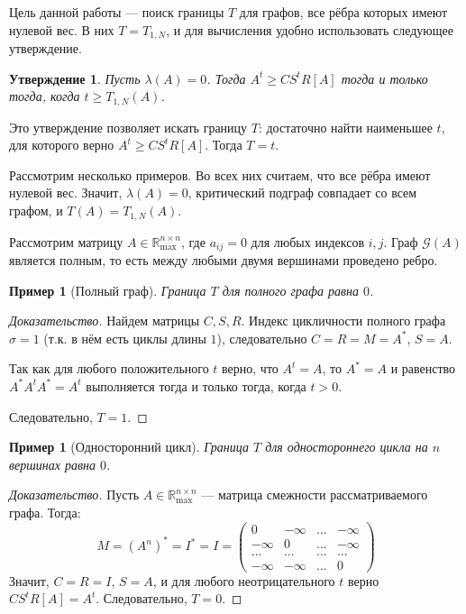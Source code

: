 \documentclass[12pt]{article}
\newtheorem{proposition}[theorem]{Утверждение}
\newtheorem{example}[theorem]{Пример}
\begin{document}
Цель данной работы --- поиск границы $T$ для графов, все рёбра которых имеют нулевой вес. В них $T = T_{1, N}$, и для вычисления удобно использовать следующее утверждение.

\begin{proposition} \cite[лемма 2.3]{bounds}
Пусть $\lambda(A) = 0$. Тогда $A^t \ge CS^tR[A]$ тогда и только тогда, когда $t \ge T_{1,N}(A)$.
\end{proposition}

Это утверждение позволяет искать границу $T$: достаточно найти наименьшее $t$, для которого верно $A^t \ge CS^tR[A]$. Тогда $T = t$.

Рассмотрим несколько примеров. Во всех них считаем, что все рёбра имеют нулевой вес. Значит, $\lambda(A) = 0$, критический подграф совпадает со всем графом, и $T(A) = T_{1, N}(A)$.

Рассмотрим матрицу $A \in \mathbb{R}_{\max}^{n \times n}$, где $a_{ij} = 0$ для любых индексов $i, j$. Граф $\mathcal{G}(A)$ является полным, то есть между любыми двумя вершинами проведено ребро.

\begin{example} [Полный граф]
Граница $T$ для полного графа равна $0$.
\end{example}
\begin{proof}[Доказательство]
Найдем матрицы $C, S, R$. Индекс цикличности полного графа $\sigma = 1 $ (т.к. в нём есть циклы длины $1$), следовательно $C = R = M = A^*$, $S = A$.

Так как для любого положительного $t$ верно, что $A^t = A$, то $A^* = A$ и равенство $A^*A^tA^* = A^t$ выполняется тогда и только тогда, когда $t > 0$.

Следовательно, $T = 1$.
\end{proof}

\begin{example}[Односторонний цикл]
Граница $T$ для одностороннего цикла на $n$ вершинах равна $0$.
\end{example}
\begin{proof}[Доказательство]
Пусть $A \in \mathbb{R}_{\max}^{n \times n}$ --- матрица смежности рассматриваемого графа. Тогда:
\begin{equation*}
M = (A^n)^* = I^* = I = \begin{pmatrix}
0 & -\infty & ... & -\infty \\
-\infty & 0 & ... & -\infty \\
... & ... & ... & ... \\
-\infty & -\infty & ... & 0
\end{pmatrix}
\end{equation*}
Значит, $C = R = I$, $S = A$, и для любого неотрицательного $t$ верно $CS^tR[A] = A^t$. Следовательно, $T = 0$.
\end{proof}
\end{document}
